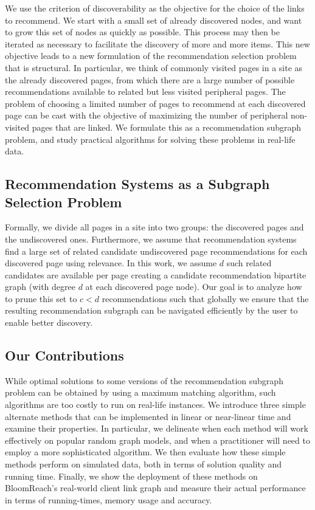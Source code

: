 We use the criterion of discoverability as the objective for the choice of the links to recommend. We start with a small set of already discovered nodes, and want to grow this set of nodes as quickly as possible. This process may then be iterated as necessary to facilitate the discovery of more and more items. This new objective leads to a new formulation of the recommendation selection problem that is structural. In particular, we think of commonly visited pages in a site as the already discovered pages, from which there are a large number of possible recommendations available to related but less visited peripheral pages. The problem of choosing a limited number of pages to recommend at each discovered page can be cast with the objective of maximizing the number of peripheral non-visited pages that are linked. We formulate this as a recommendation subgraph problem, and study practical algorithms for solving these problems in real-life data. \vs

\subsection{Recommendation Systems as a Subgraph Selection Problem}

Formally, we divide all pages in a site into two groups: the discovered pages and the undiscovered ones.
Furthermore, we assume that recommendation systems~\cite{Schafer1999, Adomavicius2005,
  Resnick1997} find a large set of related candidate undiscovered page recommendations
for each discovered page using relevance. In this work, we assume $d$
such related candidates are available per page creating a candidate recommendation bipartite graph 
(with degree $d$ at each discovered page node).
Our goal is to analyze how to prune this set to $c < d$ recommendations such that
globally we ensure that the resulting recommendation subgraph can be navigated efficiently by the user to enable better discovery. \vs

\subsection{Our Contributions}
While optimal solutions to some versions of the recommendation subgraph problem can be obtained by using a maximum matching algorithm, such algorithms are too costly to run on real-life instances. We introduce three simple alternate methods that can be implemented in linear or near-linear time and examine their properties. 
In particular, we delineate when
each method will work effectively on popular random graph models, and when a practitioner will need to employ a more sophisticated algorithm. 
We then evaluate how these simple methods perform on simulated data, both in terms of solution quality and  running time.
Finally, we show the deployment of these methods on BloomReach's real-world client link graph and measure their
actual performance in terms of running-times, memory usage and accuracy. \vs

